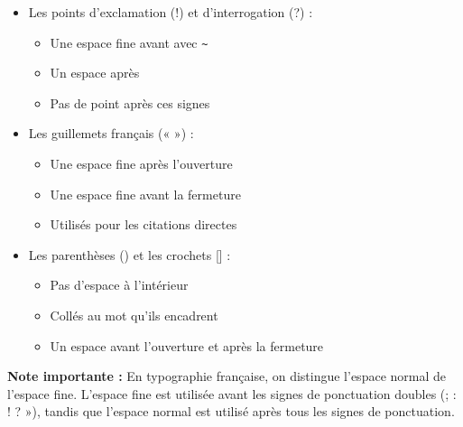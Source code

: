 \begin{tcolorbox}
\begin{itemize}[leftmargin=*]
    \item Les points d'exclamation (!) et d'interrogation (?) :
        \begin{itemize}
            \item Une espace fine avant avec \verb|~|
            \item Un espace après
            \item Pas de point après ces signes
        \end{itemize}
    
    \item Les guillemets français (« ») :
        \begin{itemize}
            \item Une espace fine après l'ouverture
            \item Une espace fine avant la fermeture
            \item Utilisés pour les citations directes
        \end{itemize}
    
    \item Les parenthèses () et les crochets [] :
        \begin{itemize}
            \item Pas d'espace à l'intérieur
            \item Collés au mot qu'ils encadrent
            \item Un espace avant l'ouverture et après la fermeture
        \end{itemize}
\end{itemize}

\textbf{Note importante :} En typographie française, on distingue l'espace normal de l'espace fine. L'espace fine est utilisée avant les signes de ponctuation doubles (; : ! ? »), tandis que l'espace normal est utilisé après tous les signes de ponctuation.

\end{tcolorbox}

